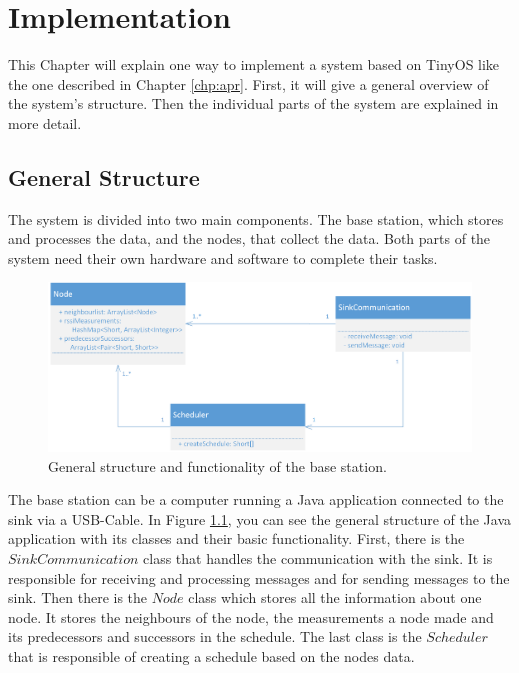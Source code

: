 \chapter{Implementation}
\label{chp:imp}
This Chapter will explain one way to implement a system based on TinyOS like the one described in Chapter \ref{chp:apr}. First, it will give a general overview of the system's structure. Then the individual parts of the system are explained in more detail.    

\section{General Structure}
\label{chp:imp_general}
The system is divided into two main components. The base station, which stores and processes the data, and the nodes, that collect the data. Both parts of the system need their own hardware and software to complete their tasks.  

\begin{figure}[htbp]
	\centering
    \includegraphics[scale=0.7]{content/images/BaseStation/Klassendiagram}
   	\caption{General structure and functionality of the base station.}
    \label{fig:bsKlassen}
\end{figure}

The base station can be a computer running a Java application connected to the sink via a USB-Cable. In Figure \ref{fig:bsKlassen}, you can see the general structure of the Java application with its classes and their basic functionality. First, there is the $SinkCommunication$ class that handles the communication with the sink. It is responsible for receiving and processing messages and for sending messages to the sink. Then there is the $Node$ class which stores all the information about one node. It stores the neighbours of the node, the measurements a node made and its predecessors and successors in the schedule. The last class is the $Scheduler$ that is responsible of creating a schedule based on the nodes data.  

